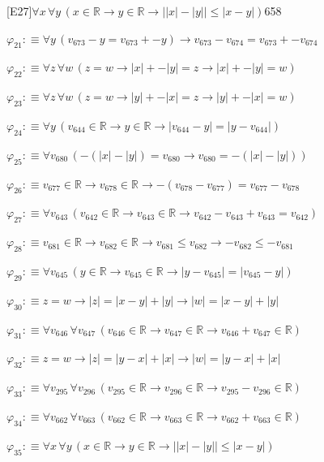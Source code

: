 \begin{fullproof}{[E27]}{$\forall x\,\forall y\,(x \in \mathbb{R} \to y \in \mathbb{R} \to \lvert \lvert x \rvert - \lvert y \rvert \rvert \leq \lvert x - y \rvert)$}{658}
\begin{abbrevlist}
\item $\varphi_{21} :\equiv \forall y\,(v_{673} - y = v_{673} + -y) \to v_{673} - v_{674} = v_{673} + -v_{674}$
\item $\varphi_{22} :\equiv \forall z\,\forall w\,(z = w \to \lvert x \rvert + -\lvert y \rvert = z \to \lvert x \rvert + -\lvert y \rvert = w)$
\item $\varphi_{23} :\equiv \forall z\,\forall w\,(z = w \to \lvert y \rvert + -\lvert x \rvert = z \to \lvert y \rvert + -\lvert x \rvert = w)$
\item $\varphi_{24} :\equiv \forall y\,(v_{644} \in \mathbb{R} \to y \in \mathbb{R} \to \lvert v_{644} - y \rvert = \lvert y - v_{644} \rvert)$
\item $\varphi_{25} :\equiv \forall v_{680}\,(-(\lvert x \rvert - \lvert y \rvert) = v_{680} \to v_{680} = -(\lvert x \rvert - \lvert y \rvert))$
\item $\varphi_{26} :\equiv v_{677} \in \mathbb{R} \to v_{678} \in \mathbb{R} \to -(v_{678} - v_{677}) = v_{677} - v_{678}$
\item $\varphi_{27} :\equiv \forall v_{643}\,(v_{642} \in \mathbb{R} \to v_{643} \in \mathbb{R} \to v_{642} - v_{643} + v_{643} = v_{642})$
\item $\varphi_{28} :\equiv v_{681} \in \mathbb{R} \to v_{682} \in \mathbb{R} \to v_{681} \leq v_{682} \to -v_{682} \leq -v_{681}$
\item $\varphi_{29} :\equiv \forall v_{645}\,(y \in \mathbb{R} \to v_{645} \in \mathbb{R} \to \lvert y - v_{645} \rvert = \lvert v_{645} - y \rvert)$
\item $\varphi_{30} :\equiv z = w \to \lvert z \rvert = \lvert x - y \rvert + \lvert y \rvert \to \lvert w \rvert = \lvert x - y \rvert + \lvert y \rvert$
\item $\varphi_{31} :\equiv \forall v_{646}\,\forall v_{647}\,(v_{646} \in \mathbb{R} \to v_{647} \in \mathbb{R} \to v_{646} + v_{647} \in \mathbb{R})$
\item $\varphi_{32} :\equiv z = w \to \lvert z \rvert = \lvert y - x \rvert + \lvert x \rvert \to \lvert w \rvert = \lvert y - x \rvert + \lvert x \rvert$
\item $\varphi_{33} :\equiv \forall v_{295}\,\forall v_{296}\,(v_{295} \in \mathbb{R} \to v_{296} \in \mathbb{R} \to v_{295} - v_{296} \in \mathbb{R})$
\item $\varphi_{34} :\equiv \forall v_{662}\,\forall v_{663}\,(v_{662} \in \mathbb{R} \to v_{663} \in \mathbb{R} \to v_{662} + v_{663} \in \mathbb{R})$
\item $\varphi_{35} :\equiv \forall x\,\forall y\,(x \in \mathbb{R} \to y \in \mathbb{R} \to \lvert \lvert x \rvert - \lvert y \rvert \rvert \leq \lvert x - y \rvert)$

\end{abbrevlist}
\end{fullproof}
